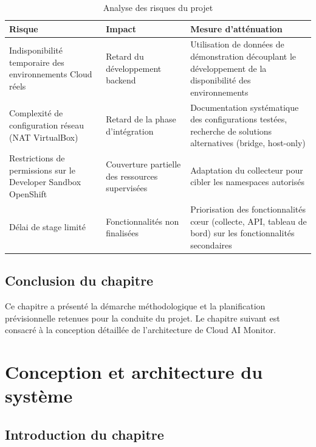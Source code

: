 \documentclass[11pt,a4paper]{report}
\begin{document}
\begin{table}[H]
\centering
\renewcommand{\arraystretch}{1.4}
\begin{tabular}{|p{4.5cm}|p{4.5cm}|p{4.3cm}|}
\hline
\textbf{Risque} & \textbf{Impact} & \textbf{Mesure d'atténuation} \\
\hline
Indisponibilité temporaire des environnements Cloud réels & Retard du
développement backend & Utilisation de données de démonstration découplant
le développement de la disponibilité des environnements \\
\hline
Complexité de configuration réseau (NAT VirtualBox) & Retard de la phase
d'intégration & Documentation systématique des configurations testées,
recherche de solutions alternatives (bridge, host-only) \\
\hline
Restrictions de permissions sur le Developer Sandbox OpenShift & Couverture
partielle des ressources supervisées & Adaptation du collecteur pour cibler
les namespaces autorisés \\
\hline
Délai de stage limité & Fonctionnalités non finalisées & Priorisation des
fonctionnalités cœur (collecte, API, tableau de bord) sur les fonctionnalités
secondaires \\
\hline
\end{tabular}
\caption{Analyse des risques du projet}
\label{tab:risques}
\end{table}

\section*{Conclusion du chapitre}

Ce chapitre a présenté la démarche méthodologique et la planification
prévisionnelle retenues pour la conduite du projet. Le chapitre suivant est
consacré à la conception détaillée de l'architecture de Cloud AI Monitor.

\newpage
\chapter{Conception et architecture du système}

\section*{Introduction du chapitre}
\end{document}

